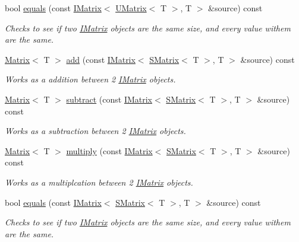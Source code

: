 \begin{DoxyCompactItemize}
bool \mbox{\hyperlink{class_l_matrix_ac869ef2359c1330f01f0af7774651efc}{equals}} (const \mbox{\hyperlink{class_i_matrix}{I\+Matrix}}$<$ \mbox{\hyperlink{class_u_matrix}{U\+Matrix}}$<$ T $>$, T $>$ \&source) const
\begin{DoxyCompactList}\small\item\em Checks to see if two \mbox{\hyperlink{class_i_matrix}{I\+Matrix}} objects are the same size, and every value withem are the same. \end{DoxyCompactList}\item 
\mbox{\hyperlink{class_matrix}{Matrix}}$<$ T $>$ \mbox{\hyperlink{class_l_matrix_acf28d86e7b4cd0552bbf70e66f38b09e}{add}} (const \mbox{\hyperlink{class_i_matrix}{I\+Matrix}}$<$ \mbox{\hyperlink{class_s_matrix}{S\+Matrix}}$<$ T $>$, T $>$ \&source) const
\begin{DoxyCompactList}\small\item\em Works as a addition between 2 \mbox{\hyperlink{class_i_matrix}{I\+Matrix}} objects. \end{DoxyCompactList}\item 
\mbox{\hyperlink{class_matrix}{Matrix}}$<$ T $>$ \mbox{\hyperlink{class_l_matrix_a6adb72b127cc79a70a4b14f19b19d915}{subtract}} (const \mbox{\hyperlink{class_i_matrix}{I\+Matrix}}$<$ \mbox{\hyperlink{class_s_matrix}{S\+Matrix}}$<$ T $>$, T $>$ \&source) const
\begin{DoxyCompactList}\small\item\em Works as a subtraction between 2 \mbox{\hyperlink{class_i_matrix}{I\+Matrix}} objects. \end{DoxyCompactList}\item 
\mbox{\hyperlink{class_matrix}{Matrix}}$<$ T $>$ \mbox{\hyperlink{class_l_matrix_a0cf963fd6b5fae298b7bf62198ce4371}{multiply}} (const \mbox{\hyperlink{class_i_matrix}{I\+Matrix}}$<$ \mbox{\hyperlink{class_s_matrix}{S\+Matrix}}$<$ T $>$, T $>$ \&source) const
\begin{DoxyCompactList}\small\item\em Works as a multiplcation between 2 \mbox{\hyperlink{class_i_matrix}{I\+Matrix}} objects. \end{DoxyCompactList}\item 
bool \mbox{\hyperlink{class_l_matrix_ae7c915ab41167123252a6a4a29c429b8}{equals}} (const \mbox{\hyperlink{class_i_matrix}{I\+Matrix}}$<$ \mbox{\hyperlink{class_s_matrix}{S\+Matrix}}$<$ T $>$, T $>$ \&source) const
\begin{DoxyCompactList}\small\item\em Checks to see if two \mbox{\hyperlink{class_i_matrix}{I\+Matrix}} objects are the same size, and every value withem are the same. \end{DoxyCompactList}\item 

\end{DoxyCompactItemize}
